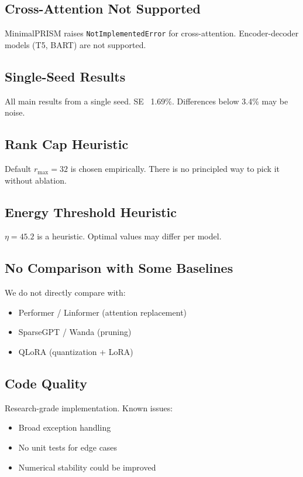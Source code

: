 \subsection{Cross-Attention Not Supported}

MinimalPRISM raises \texttt{NotImplementedError} for cross-attention. 
Encoder-decoder models (T5, BART) are not supported.

\subsection{Single-Seed Results}

All main results from a single seed. SE ~1.69\%. Differences below 3.4\% may 
be noise.

\subsection{Rank Cap Heuristic}

Default $r_\text{max} = 32$ is chosen empirically. There is no 
principled way to pick it without ablation.

\subsection{Energy Threshold Heuristic}

$\eta = 45.2$ is a heuristic. Optimal values may differ per model.

\subsection{No Comparison with Some Baselines}

We do not directly compare with:
\begin{itemize}
\item Performer / Linformer (attention replacement)
\item SparseGPT / Wanda (pruning)
\item QLoRA (quantization + LoRA)

\end{itemize}
\subsection{Code Quality}

Research-grade implementation. Known issues:
\begin{itemize}
\item Broad exception handling
\item No unit tests for edge cases
\item Numerical stability could be improved

\end{itemize}
